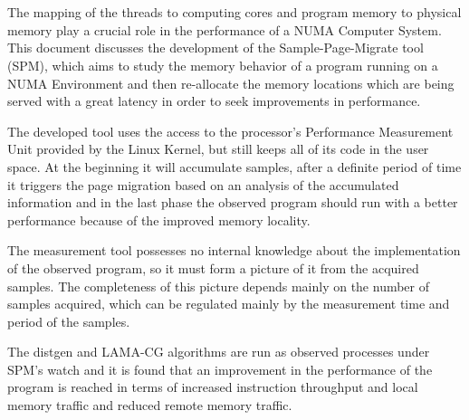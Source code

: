 \chapter{\abstractname}


The mapping of the threads to computing cores and program memory to physical memory play a crucial role in the performance of a NUMA Computer System. This document discusses the development of the Sample-Page-Migrate tool (SPM), which aims to study the memory behavior of a program running on a NUMA Environment and then re-allocate the memory locations which are being served with a great latency in order to seek improvements in performance.

The developed tool uses the access to the processor’s Performance Measurement Unit provided by the Linux Kernel, but still keeps all of its code in the user space. At the beginning it will accumulate samples, after a definite period of time it triggers the page migration based on an analysis of the accumulated information and in the last phase the observed program should run with a better performance because of the improved memory locality.

The measurement tool possesses no internal knowledge about the implementation of the observed program, so it must form a picture of it from the acquired samples. The completeness of this picture depends mainly on the number of samples acquired, which can be regulated mainly by the measurement time and period of the samples. 

The distgen and LAMA-CG algorithms are run as observed processes under SPM’s watch and it is found that an improvement in the performance of the program is reached in terms of increased instruction throughput and local memory traffic and reduced remote memory traffic.

\pagebreak
